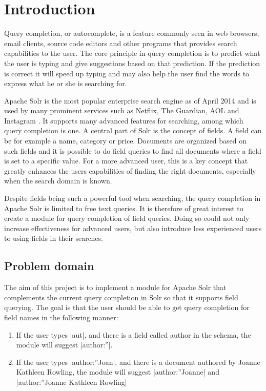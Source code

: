 \section{Introduction}\label{introduction}
Query completion, or autocomplete, is a feature commonly seen in web browsers, email clients, source code editors and other programs that provides search capabilities to the user. The core principle in query completion is to predict what the user is typing and give suggestions based on that prediction. If the prediction is correct it will speed up typing and may also help the user find the words to express what he or she is searching for. 

Apache Solr is the most popular enterprise search engine as of April 2014\cite{RANKINGS} and is used by many prominent services such as Netflix, The Guardian, AOL and Instagram \cite{SOLR::USAGE}. It supports many advanced features for searching, among which query completion is one. A central part of Solr is the concept of fields. A field can be for example a name, category or price. Documents are organized based on such fields and it is possible to do field queries to find all documents where a field is set to a specific value. For a more advanced user, this is a key concept that greatly enhances the users capabilities of finding the right documents, especially when the search domain is known. 

Despite fields being such a powerful tool when searching, the query completion in Apache Solr is limited to free text queries. It is therefore of great interest to create a module for query completion of field queries. Doing so could not only increase effectiveness for advanced users, but also introduce less experienced users to using fields in their searches.


\subsection{Problem domain}

The aim of this project is to implement a module for Apache Solr that complements the current query completion in Solr so that it supports field querying. The goal is that the user should be able to get query completion for field names in the following manner:
\begin{enumerate}
\item   If the user types |aut|, and there is a field called author in the schema, the module will suggest |author:”|. 
\item   If the user types |author:”Joan|, and there is a document authored by Joanne Kathleen Rowling, the module will suggest |author:”Joanne| and |author:”Joanne Kathleen Rowling|
\end{enumerate}


